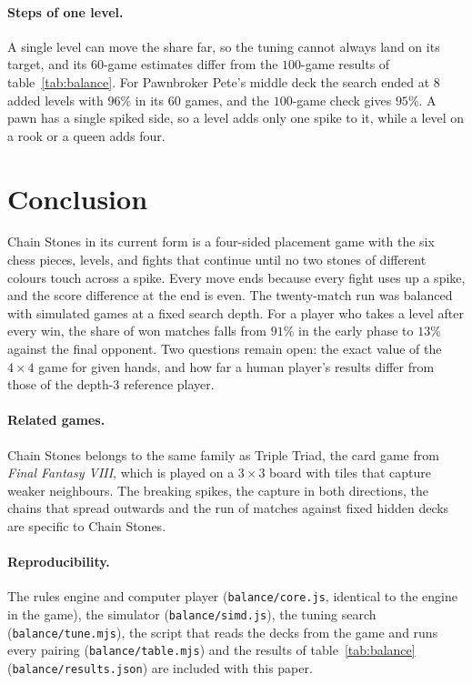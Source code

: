 \documentclass[11pt,a4paper]{article}
\begin{document}
\paragraph{Steps of one level.} A single level can move the share far, so the tuning cannot always land on its target, and its $60$-game estimates differ from the $100$-game results of table~\ref{tab:balance}. For Pawnbroker Pete's middle deck the search ended at $8$ added levels with $96\%$ in its $60$ games, and the $100$-game check gives $95\%$. A pawn has a single spiked side, so a level adds only one spike to it, while a level on a rook or a queen adds four.

\section{Conclusion}

Chain Stones in its current form is a four-sided placement game with the six chess pieces, levels, and fights that continue until no two stones of different colours touch across a spike. Every move ends because every fight uses up a spike, and the score difference at the end is even. The twenty-match run was balanced with simulated games at a fixed search depth. For a player who takes a level after every win, the share of won matches falls from $91\%$ in the early phase to $13\%$ against the final opponent. Two questions remain open: the exact value of the $4\times4$ game for given hands, and how far a human player's results differ from those of the depth-3 reference player.

\paragraph{Related games.} Chain Stones belongs to the same family as Triple Triad, the card game from \emph{Final Fantasy VIII}, which is played on a $3\times3$ board with tiles that capture weaker neighbours. The breaking spikes, the capture in both directions, the chains that spread outwards and the run of matches against fixed hidden decks are specific to Chain Stones.

\paragraph{Reproducibility.} The rules engine and computer player (\texttt{balance/core.js}, identical to the engine in the game), the simulator (\texttt{balance/simd.js}), the tuning search (\texttt{balance/tune.mjs}), the script that reads the decks from the game and runs every pairing (\texttt{balance/table.mjs}) and the results of table~\ref{tab:balance} (\texttt{balance/results.json}) are included with this paper.
\end{document}
